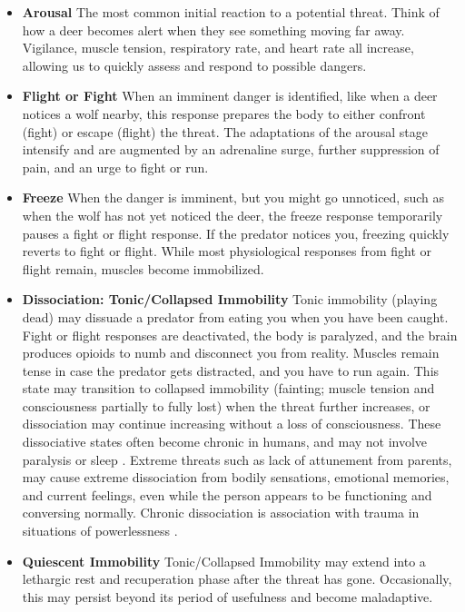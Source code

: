 \documentclass[12pt,letterpaper]{book}
\begin{document}
\begin{itemize}
    \item \textbf{Arousal} The most common initial reaction to a potential threat. Think of how a deer becomes alert when they see something moving far away. Vigilance, muscle tension, respiratory rate, and heart rate all increase, allowing us to quickly assess and respond to possible dangers.
    \item \textbf{Flight or Fight} When an imminent danger is identified, like when a deer notices a wolf nearby, this response prepares the body to either confront (fight) or escape (flight) the threat. The adaptations of the arousal stage intensify and are augmented by an adrenaline surge, further suppression of pain, and an urge to fight or run.
    \item \textbf{Freeze} When the danger is imminent, but you might go unnoticed, such as when the wolf has not yet noticed the deer, the freeze response temporarily pauses a fight or flight response. If the predator notices you, freezing quickly reverts to fight or flight. While most physiological responses from fight or flight remain, muscles become immobilized.
    \item \textbf{Dissociation: Tonic/Collapsed Immobility} Tonic immobility (playing dead) may dissuade a predator from eating you when you have been caught. Fight or flight responses are deactivated, the body is paralyzed, and the brain produces opioids to numb and disconnect you from reality. Muscles remain tense in case the predator gets distracted, and you have to run again. This state may transition to collapsed immobility (fainting; muscle tension and consciousness partially to fully lost) when the threat further increases, or dissociation may continue increasing without a loss of consciousness. These dissociative states often become chronic in humans, and may not involve paralysis or sleep \cite{razviPSIP}. Extreme threats such as lack of attunement from parents, may cause extreme dissociation from bodily sensations, emotional memories, and current feelings, even while the person appears to be functioning and conversing normally. Chronic dissociation is association with trauma in situations of powerlessness \cite{loewensteinDissociation}. 
    \item \textbf{Quiescent Immobility} Tonic/Collapsed Immobility may extend into a lethargic rest and recuperation phase after the threat has gone. Occasionally, this may persist beyond its period of usefulness and become maladaptive.
\end{itemize}
\end{document}
